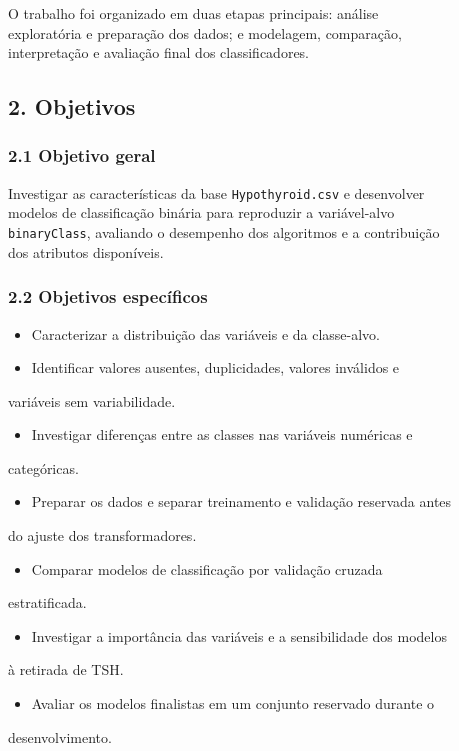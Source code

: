 \documentclass{article}
\begin{document}
O trabalho foi organizado em duas etapas principais: análise \\
exploratória e preparação dos dados; e modelagem, comparação, \\
interpretação e avaliação final dos classificadores. \\

\subsection{2. Objetivos}

\subsubsection{2.1 Objetivo geral}

Investigar as características da base \texttt{Hypothyroid.csv} e desenvolver \\
modelos de classificação binária para reproduzir a variável-alvo \\
\texttt{binaryClass}, avaliando o desempenho dos algoritmos e a contribuição \\
dos atributos disponíveis. \\

\subsubsection{2.2 Objetivos específicos}

\begin{itemize}
  \item   Caracterizar a distribuição das variáveis e da classe-alvo.
  \item   Identificar valores ausentes, duplicidades, valores inválidos e
\end{itemize}
variáveis sem variabilidade. \\
\begin{itemize}
  \item   Investigar diferenças entre as classes nas variáveis numéricas e
\end{itemize}
categóricas. \\
\begin{itemize}
  \item   Preparar os dados e separar treinamento e validação reservada antes
\end{itemize}
do ajuste dos transformadores. \\
\begin{itemize}
  \item   Comparar modelos de classificação por validação cruzada
\end{itemize}
estratificada. \\
\begin{itemize}
  \item   Investigar a importância das variáveis e a sensibilidade dos modelos
\end{itemize}
à retirada de TSH. \\
\begin{itemize}
  \item   Avaliar os modelos finalistas em um conjunto reservado durante o
\end{itemize}
desenvolvimento. \\
\end{document}
